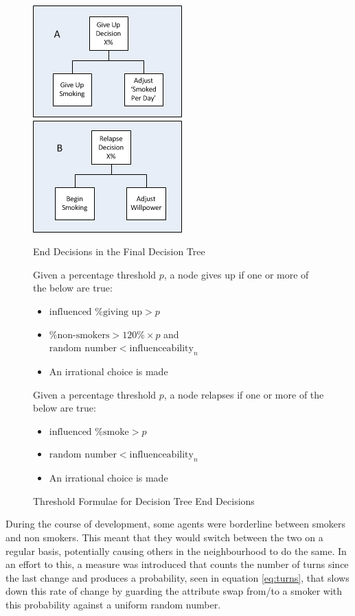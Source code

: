 \documentclass[]{report}
\begin{document}
\begin{figure}
\label{img:end-dec}
\begin{center}
\includegraphics[scale=1]{End-DecA.png}
\includegraphics[scale=1]{End-DecB.png}
\end{center}
\caption{End Decisions in the Final Decision Tree}
\end{figure}

\begin{figure}
\label{eq:end-thresh}
Given a percentage threshold $p$, a node gives up if one or more of the below are true:
\begin{itemize}
\item $\text{influenced \% giving up} > p$
\item $\text{\% non-smokers} > 120\% \times p$ and $\text{random number} < \text{influenceability}_{n}$
\item An irrational choice is made
\end{itemize}

Given a percentage threshold $p$, a node relapses if one or more of the below are true:
\begin{itemize}
\item $\text{influenced \% smoke} > p$
\item $\text{random number} < \text{influenceability}_{n}$
\item An irrational choice is made
\end{itemize}
\caption{Threshold Formulae for Decision Tree End Decisions}
\end{figure}

During the course of development, some agents were borderline between smokers and non smokers. This meant that they would switch between the two on a regular basis, potentially causing others in the neighbourhood to do the same. In an effort to this, a measure was introduced that counts the number of turns since the last change and produces a probability, seen in equation \ref{eq:turns}, that slows down this rate of change by guarding the attribute swap from/to a smoker with this probability against a uniform random number.
\end{document}
